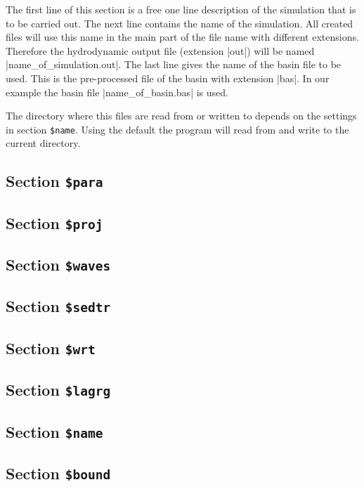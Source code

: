 \documentclass{report}
\begin{document}
The first line of this section is a free one line description of
the simulation that is to be carried out. The next line contains
the name of the simulation.
All created files will use this name in the main part of the file name
with different extensions. Therefore the hydrodynamic output file
(extension |out|) will be named |name_of_simulation.out|.
The last line gives the name of the basin file to be used. This
is the pre-processed file of the basin with extension |bas|.
In our example the basin file |name_of_basin.bas| is used.

The directory where this files are read from or written to depends
on the settings in section {\tt \$name}. Using the default
the program will read from and write to the current directory.

\subsection{Section {\tt \$para}}


\subsection{Section {\tt \$proj}}


\subsection{Section {\tt \$waves}}


\subsection{Section {\tt \$sedtr}}


\subsection{Section {\tt \$wrt}}


\subsection{Section {\tt \$lagrg}}


\subsection{Section {\tt \$name}}


\subsection{Section {\tt \$bound}}

\end{document}
